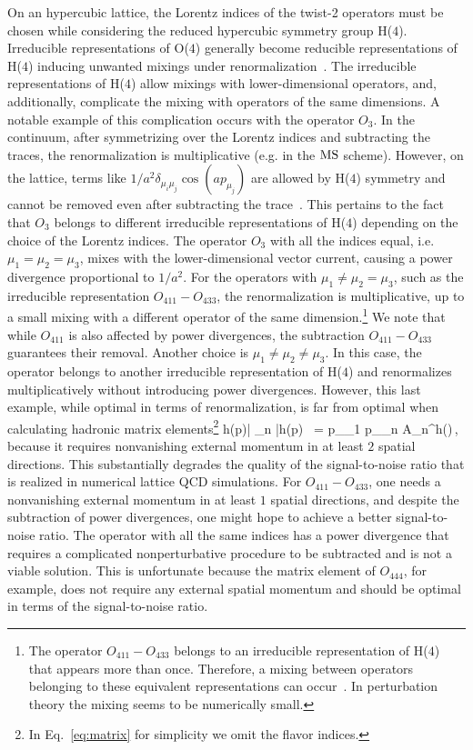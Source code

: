 On an hypercubic lattice, the Lorentz indices of the
twist-2 operators must be chosen while considering the reduced
hypercubic symmetry group H($4$).
Irreducible representations of O($4$) generally become reducible
representations of H($4$) inducing
unwanted mixings under
renormalization~\cite{Kronfeld:1984zv,Martinelli:1987zd,Beccarini:1995iv,Gockeler:1996mu}.
The irreducible representations of H($4$)
allow mixings with lower-dimensional operators,
and, additionally, complicate the mixing with operators of the same dimensions.
A notable example of this complication occurs with the operator $O_3$.
In the continuum, after
symmetrizing over the Lorentz indices and subtracting the traces,
the renormalization is multiplicative (e.g. in the $\text{MS}$ scheme).
However, on the lattice, terms like $1/a^2 \delta_{\mu_i \mu_j} \cos( a p_{\mu_j})$
are allowed by H($4$) symmetry and cannot be removed even after subtracting
the trace~\cite{Kronfeld:1984zv}.
This pertains to the fact that $O_3$ belongs
to different irreducible representations of H($4$)
depending on the choice of the Lorentz indices.
The operator $O_3$ with
all the indices equal, i.e. $\mu_1 = \mu_2 = \mu_3$, mixes with the
lower-dimensional vector current, causing a power divergence proportional
to $1/a^2$. For the operators with $\mu_1 \neq \mu_2 = \mu_3$,
such as the irreducible representation $O_{411} - O_{433}$,
the renormalization is multiplicative, up to a small mixing with
a different operator of the same dimension.\footnote{
    The operator $O_{411} - O_{433}$ belongs to an irreducible
    representation of H($4$) that appears more than once.
    Therefore, a mixing between operators
    belonging to these equivalent representations can occur~\cite{Beccarini:1995iv}.
    In perturbation theory the mixing seems to be numerically small.
}
We note that while $O_{411}$ is also affected by power divergences,
the subtraction $O_{411} - O_{433}$
guarantees their removal.
Another choice is $\mu_1 \neq \mu_2 \neq \mu_3$. In this case, the operator belongs
to another irreducible representation of H($4$) and renormalizes multiplicatively
without introducing power divergences.
However, this last example, while optimal in terms of renormalization, is far from
optimal when calculating hadronic matrix elements\footnote{In Eq.~\eqref{eq:matrix} for simplicity
we omit the flavor indices.}
\be
\left \langle h(p)| _n |h(p) \right\rangle\ =
p_{\mu_1} \cdots p_{\mu_n} A_n^{h}(\mu)\,,
\label{eq:matrix}
\ee
because it requires nonvanishing external momentum in at least $2$ spatial directions.
This substantially degrades the quality of the signal-to-noise ratio
that is realized in numerical lattice QCD simulations.
For $O_{411} - O_{433}$, one needs a nonvanishing external momentum in at least
$1$ spatial directions, and despite the subtraction of power divergences,
one might hope to achieve a better signal-to-noise ratio.
The operator with all the same indices has a power divergence that requires
a complicated nonperturbative procedure to be subtracted and is
not a viable solution. This is unfortunate because the matrix element
of $O_{444}$, for example, does not require any external spatial momentum
and should be optimal in terms of the signal-to-noise ratio.

